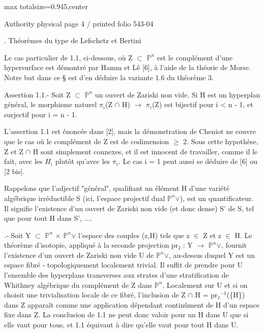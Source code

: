 \documentclass[10pt,a4paper]{article}
\begin{document}
\noindent\begin{adjustbox}{max totalsize={\textwidth}{0.945\textheight},center}
\begin{minipage}{\textwidth}
\noindent\hfill\scriptsize Authority physical page 4 / printed folio 543-04\par\normalsize
{}. Théorèmes du type de Lefschetz et Bertini\par\smallskip
\noindent Le cas particulier de 1.1, ci-dessous, où Z \ensuremath{⊂} \ensuremath{ℙ^n} est le complément d'une hypersurface est démontré par Hamm et Lê [6], à l'aide de la théorie de Morse. Notre but dans ce § est d'en déduire la variante 1.6 du théorème 3.\par\smallskip
\noindent Assertion 1.1.- Soit Z \ensuremath{⊂} \ensuremath{ℙ^n} un ouvert de Zariski non vide. Si H est un hyperplan général, le morphisme naturel \ensuremath{π_i}(Z \ensuremath{∩} H) \ensuremath{→} \ensuremath{π_i}(Z) est bijectif pour i < n - 1, et surjectif pour i = n - 1.\par\smallskip
\noindent L'assertion 1.1 est énoncée dans [2], mais la démonstration de Cheniot ne couvre que le cas où le complément de Z est de codimension \ensuremath{≥} 2. Sous cette hypothèse, Z et Z \ensuremath{∩} H sont simplement connexes, et il est innocent de travailler, comme il le fait, avec les \ensuremath{H_i} plutôt qu'avec les \ensuremath{π_i}. Le cas i = 1 peut aussi se déduire de [6] ou [2 bis].\par\smallskip
\noindent Rappelons que l'adjectif "général", qualifiant un élément H d'une variété algébrique irréductible S (ici, l'espace projectif dual \ensuremath{ℙ^n}\ensuremath{∨}), est un quantificateur. Il signifie l'existence d'un ouvert de Zariski non vide (et donc dense) S' de S, tel que pour tout H dans S', ....\par\smallskip
{}.- Soit Y \ensuremath{⊂} \ensuremath{ℙ^n} \ensuremath{×} \ensuremath{ℙ^n}\ensuremath{∨} l'espace des couples (z,H) tels que z \ensuremath{∈} Z et z \ensuremath{∈} H. Le théorème d'isotopie, appliqué à la seconde projection pr\ensuremath{₂} : Y \ensuremath{→} \ensuremath{ℙ^n}\ensuremath{∨}, fournit l'existence d'un ouvert de Zariski non vide U de \ensuremath{ℙ^n}\ensuremath{∨}, au-dessus duquel Y est un espace fibré - topologiquement localement trivial. Il suffit de prendre pour U l'ensemble des hyperplans transverses aux strates d'une stratification de Whithney algébrique du complément de Z dans \ensuremath{ℙ^n}. Localement sur U et si on choisit une trivialisation locale de ce fibré, l'inclusion de Z \ensuremath{∩} H = pr\ensuremath{₂^{-1}}(\{H\}) dans Z apparaît comme une application dépendant continûment de H d'un espace fixe dans Z. La conclusion de 1.1 ne peut donc valoir pour un H dans U que si elle vaut pour tous, et 1.1 équivaut à dire qu'elle vaut pour tout H dans U.\par\smallskip

\end{minipage}
\end{adjustbox}
\end{document}
